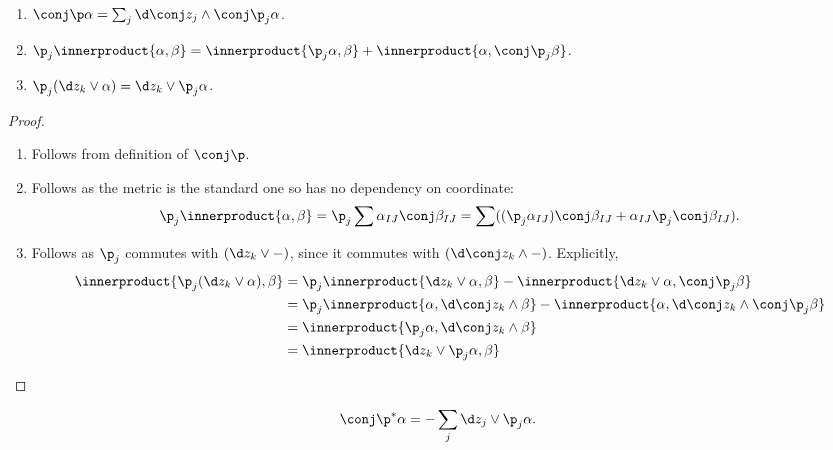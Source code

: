 \documentclass[a4paper]{article}
\newcommand{\w}{\wedge} %
\newcommand*{\ip}{\innerproduct}
\begin{document}
\begin{lemma}\leavevmode
  \begin{enumerate}
  \item \(\conj \p \alpha = \sum_j \d \conj z_j \w \conj \p_j \alpha\).
  \item \(\p_j \ip{\alpha, \beta} = \ip{\p_j \alpha, \beta} + \ip{\alpha, \conj \p_j \beta}\).
  \item \(\p_j (\d z_k \vee \alpha) = \d z_k \vee \p_j \alpha\).
  \end{enumerate}
\end{lemma}

\begin{proof}\leavevmode
  \begin{enumerate}
  \item Follows from definition of \(\conj \p\).
  \item Follows as the metric is the standard one so has no dependency on coordinate:
    \[
      \p_j \ip{\alpha, \beta}
      = \p_j \sum \alpha_{IJ} \conj \beta_{IJ}
      = \sum ((\p_j \alpha_{IJ}) \conj \beta_{IJ} + \alpha_{IJ} \p_j \conj \beta_{IJ}).
    \]
  \item Follows as \(\p_j\) commutes with \((\d z_k \vee -)\), since it commutes with \((\d \conj z_k \w -)\). Explicitly,
    \begin{align*}
      \ip{\p_j (\d z_k \vee \alpha), \beta}
      &= \p_j \ip{\d z_k \vee \alpha, \beta} - \ip{\d z_k \vee \alpha, \conj \p_j \beta} \\
      &= \p_j \ip{\alpha, \d \conj z_k \w \beta} - \ip{\alpha, \d \conj z_k \w \conj \p_j \beta} \\
      &= \ip{\p_j \alpha, \d \conj z_k \w \beta} \\
      &= \ip{\d z_k \vee \p_j \alpha, \beta}
    \end{align*}
  \end{enumerate}
\end{proof}

\begin{lemma}
  \[
    \conj \p^* \alpha = - \sum_j \d z_j \vee \p_j \alpha.
  \]
\end{lemma}
\end{document}
